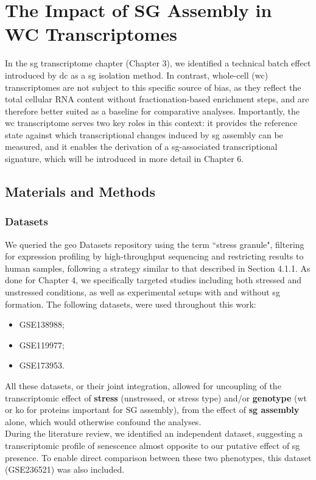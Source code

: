 \chapter{The Impact of SG Assembly in WC Transcriptomes}
\label{chap:ChapterIV}

In the \gls{sg} transcriptome chapter (Chapter 3), we identified a technical batch effect introduced by \gls{dc} as a \gls{sg} isolation method. In contrast, whole-cell (\gls{wc}) transcriptomes are not subject to this specific source of bias, as they reflect the total cellular RNA content without fractionation-based enrichment steps, and are therefore better suited as a baseline for comparative analyses. Importantly, the \gls{wc} transcriptome serves two key roles in this context: it provides the reference state against which transcriptional changes induced by \gls{sg} assembly can be measured, and it enables the derivation of a \gls{sg}-associated transcriptional signature, which will be introduced in more detail in Chapter 6. 

\section{Materials and Methods}

\subsection{Datasets}

We queried the \gls{geo} Datasets repository using the term ``stress granule", filtering for expression profiling by high-throughput sequencing and restricting results to human samples, following a strategy similar to that described in Section 4.1.1. As done for Chapter 4, we specifically targeted studies including both stressed and unstressed conditions, as well as experimental setups with and without \gls{sg} formation. 
\linebreak
\noindent
The following datasets, were used throughout this work:

\begin{itemize}
	\item GSE138988\cite{matheny_transcriptome-wide_2019};
	\item GSE119977\cite{matheny_rna_2021, matheny_corrigendum_2023};
	\item GSE173953\cite{paget_stress_2023}.
\end{itemize}
\noindent
All these datasets, or their joint integration, allowed for uncoupling of the transcriptomic effect of \textbf{stress} (unstressed, or stress type) and/or \textbf{genotype} (\gls{wt} or \gls{ko} for proteins important for SG assembly), from the effect of \textbf{\gls{sg} assembly} alone, which would otherwise confound the analyses.
\\
\linebreak
\noindent
During the literature review, we identified an independent dataset, suggesting a transcriptomic profile of senescence almost opposite to our putative effect of \gls{sg} presence. To enable direct comparison between these two phenotypes, this dataset (GSE236521\cite{lopez-polo_release_2024}) was also included.

